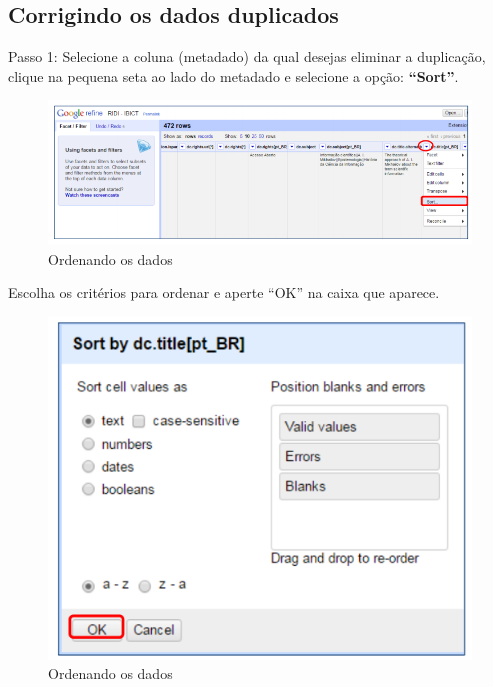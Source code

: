 \documentclass[12pt,hidelinks]{article}
\begin{document}
\newpage
    
    \subsection{Corrigindo os dados duplicados}
    
    Passo 1: Selecione a coluna (metadado) da qual desejas eliminar a duplicação, clique na pequena seta ao lado do metadado e selecione a opção: \textbf{“Sort”}. 
    
    \begin{figure}[!htp]
                \centering
                \includegraphics[scale=0.8]{figura/Figura203.png}
                \caption{Ordenando os dados}
            \label{Rotulo}
        \end{figure}
    
    Escolha os critérios para ordenar e aperte “OK” na caixa que aparece.
    
    \begin{figure}[!htp]
                \centering
                \includegraphics[scale=0.8]{figura/Figura204.png}
                \caption{Ordenando os dados}
            \label{Rotulo}
        \end{figure}
    
\end{document}

